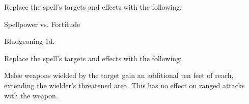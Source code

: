 Replace the spell's targets and effects with the following:
\begin{spellcontent}

\begin{augmenttargetinginfo}



\end{augmenttargetinginfo}


\begin{augmenteffects}




\begin{spellattack}{Spellpower vs. Fortitude}


\spellsuccess Bludgeoning  \minus1d.


\end{spellattack}





\end{augmenteffects}

\end{spellcontent}








Replace the spell's targets and effects with the following:
\begin{spellcontent}

\begin{augmenttargetinginfo}



\end{augmenttargetinginfo}


\begin{augmenteffects}



\spelleffect
Melee weapons wielded by the target gain an additional ten feet of reach, extending the wielder's threatened area.
This has no effect on ranged attacks with the weapon.








\end{augmenteffects}

\end{spellcontent}






